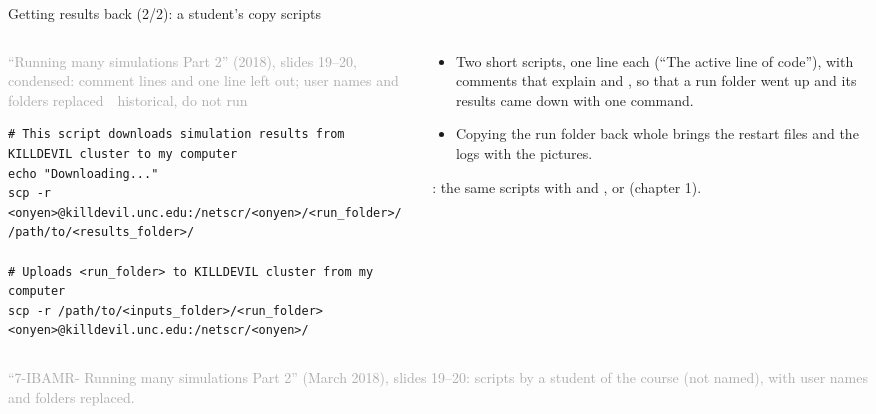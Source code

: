 \documentclass[aspectratio=169,11pt]{beamer}
\newcommand{\sourcecredit}[1]{\vfill\begin{flushright}\tiny\textcolor{DarkGray}{#1}\end{flushright}}
\newcommand{\hist}[1]{{\tiny\sffamily\textcolor{DarkGray}{#1\ \textbullet\ historical, do not run}}\par\nointerlineskip\vspace{0.3mm}}
\begin{document}
\begin{frame}[fragile]{Getting results back (2/2): a student's copy scripts}
\label{fr:results2}
\begin{columns}[T,onlytextwidth]
\begin{column}{0.55\textwidth}
\hist{``Running many simulations Part 2'' (2018), slides 19--20, condensed: comment lines and one \code{echo} line left out; user names and folders replaced}
\begin{lstlisting}[style=hist]
# This script downloads simulation results from KILLDEVIL cluster to my computer
echo "Downloading..."
scp -r <onyen>@killdevil.unc.edu:/netscr/<onyen>/<run_folder>/ /path/to/<results_folder>/

# Uploads <run_folder> to KILLDEVIL cluster from my computer
scp -r /path/to/<inputs_folder>/<run_folder> <onyen>@killdevil.unc.edu:/netscr/<onyen>/
\end{lstlisting}
\end{column}
\begin{column}{0.42\textwidth}
\footnotesize
\begin{itemize}\setlength{\itemsep}{2pt}
  \item Two short scripts, one  line each (``The active line of code''), with comments that explain  and , so that a run folder went up and its results came down with one command.
  \item Copying the run folder back whole brings the restart files and the logs with the pictures.
\end{itemize}
\vspace{1mm}
: the same scripts with  and , or  (chapter 1).
\end{column}
\end{columns}
\sourcecredit{``7-IBAMR- Running many simulations Part 2'' (March 2018), slides 19--20: scripts by a student of the course (not named), with user names and folders replaced.}
\end{frame}
\end{document}
